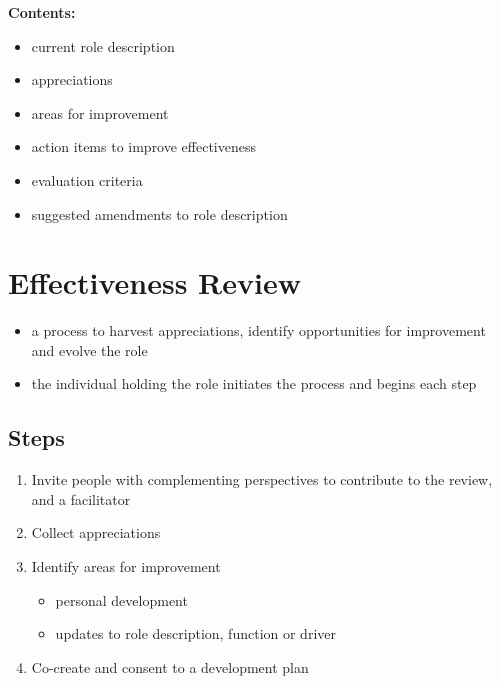 \textbf{Contents:}

\begin{itemize}
\item current role description

\item appreciations

\item areas for improvement

\item action items to improve effectiveness

\item evaluation criteria

\item suggested amendments to role description

\end{itemize}

\section{Effectiveness Review}
\label{effectivenessreview}

\begin{itemize}
\item a process to harvest appreciations, identify opportunities for improvement and evolve the role

\item the individual holding the role initiates the process and begins each step

\end{itemize}

\subsection{Steps}
\label{steps}

\begin{enumerate}
\item Invite people with complementing perspectives to contribute to the review, and a facilitator

\item Collect appreciations

\item Identify areas for improvement

\begin{itemize}
\item personal development

\item updates to role description, function or driver

\end{itemize}

\item Co-create and consent to a development plan

\end{enumerate}

